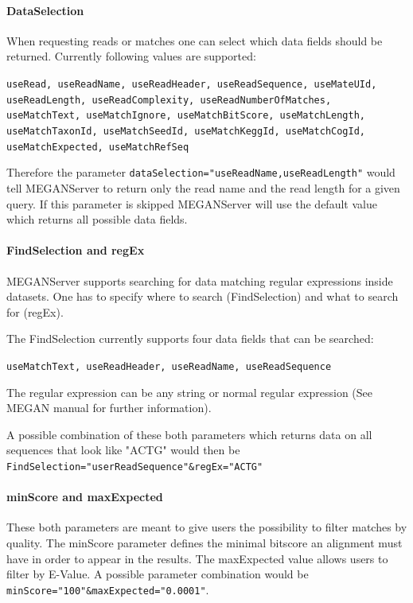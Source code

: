 \documentclass[11pt]{article}
\begin{document}
\paragraph{DataSelection}
\label{subsec:datasel}

When requesting reads or matches one can select which data fields should be returned. Currently following values are supported:


\texttt{useRead, useReadName, useReadHeader, useReadSequence, useMateUId, useReadLength, useReadComplexity, useReadNumberOfMatches, useMatchText, useMatchIgnore, useMatchBitScore, useMatchLength, useMatchTaxonId, useMatchSeedId, useMatchKeggId, useMatchCogId, useMatchExpected, useMatchRefSeq}

Therefore the parameter \texttt{dataSelection="useReadName,useReadLength"} would tell MEGANServer to return only the read name and the read length for a given query. If this parameter is skipped MEGANServer will use the default value which returns all possible data fields.






\paragraph{FindSelection and regEx}
\label{subsec:findsel}
MEGANServer supports searching for data matching regular expressions inside datasets. One has to specify where to search (FindSelection) and what to search for (regEx).

The FindSelection currently supports four data fields that can be searched:

\texttt{useMatchText, useReadHeader, useReadName, useReadSequence}

The regular expression can be any string or normal regular expression (See MEGAN manual for further information).

A possible combination of these both parameters which returns data on all sequences that look like "ACTG" would then be \texttt{FindSelection="userReadSequence"\&regEx="ACTG"}




\paragraph{minScore and maxExpected}
\label{subsec:minScore}
These both parameters are meant to give users the possibility to filter matches by quality. The minScore parameter defines the minimal bitscore an alignment must have in order to appear in the results. The maxExpected value allows users to filter by E-Value. A possible parameter combination would be \texttt{minScore="100"\&maxExpected="0.0001"}.
\end{document}

